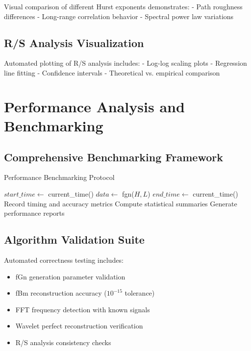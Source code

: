 \documentclass[11pt,a4paper]{article}
\begin{document}
Visual comparison of different Hurst exponents demonstrates:
- Path roughness differences
- Long-range correlation behavior
- Spectral power law variations

\subsection{R/S Analysis Visualization}

Automated plotting of R/S analysis includes:
- Log-log scaling plots
- Regression line fitting
- Confidence intervals
- Theoretical vs. empirical comparison

\section{Performance Analysis and Benchmarking}

\subsection{Comprehensive Benchmarking Framework}

\begin{algorithm}
\caption{Performance Benchmarking Protocol}
\begin{algorithmic}[1]
                \State $start\_time \gets$ current\_time()
                \State $data \gets$ fgn($H, L$)
                \State $end\_time \gets$ current\_time()
                \State Record timing and accuracy metrics
            \EndFor
        \EndFor
    \EndFor
    \State Compute statistical summaries
    \State Generate performance reports
\EndProcedure
\end{algorithmic}
\end{algorithm}

\subsection{Algorithm Validation Suite}

Automated correctness testing includes:
\begin{itemize}
    \item fGn generation parameter validation
    \item fBm reconstruction accuracy ($10^{-15}$ tolerance)
    \item FFT frequency detection with known signals
    \item Wavelet perfect reconstruction verification
    \item R/S analysis consistency checks
\end{itemize}
\end{document}
